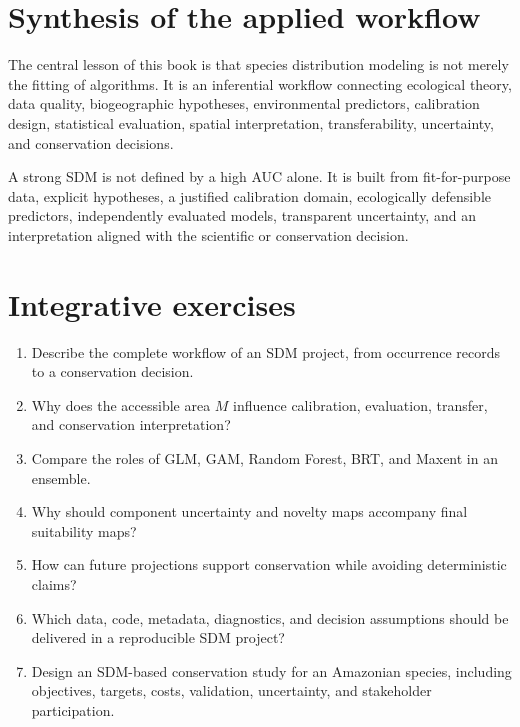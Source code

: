 \section{Synthesis of the applied workflow}

The central lesson of this book is that species distribution modeling is not merely the fitting of algorithms. It is an inferential workflow connecting ecological theory, data quality, biogeographic hypotheses, environmental predictors, calibration design, statistical evaluation, spatial interpretation, transferability, uncertainty, and conservation decisions.

\begin{conceito}[title={\faBook\quad Final applied message}]
A strong SDM is not defined by a high AUC alone. It is built from fit-for-purpose data, explicit hypotheses, a justified calibration domain, ecologically defensible predictors, independently evaluated models, transparent uncertainty, and an interpretation aligned with the scientific or conservation decision.
\end{conceito}

\section{Integrative exercises}

\begin{enumerate}
\item Describe the complete workflow of an SDM project, from occurrence records to a conservation decision.
\item Why does the accessible area \(M\) influence calibration, evaluation, transfer, and conservation interpretation?
\item Compare the roles of GLM, GAM, Random Forest, BRT, and Maxent in an ensemble.
\item Why should component uncertainty and novelty maps accompany final suitability maps?
\item How can future projections support conservation while avoiding deterministic claims?
\item Which data, code, metadata, diagnostics, and decision assumptions should be delivered in a reproducible SDM project?
\item Design an SDM-based conservation study for an Amazonian species, including objectives, targets, costs, validation, uncertainty, and stakeholder participation.
\end{enumerate}

